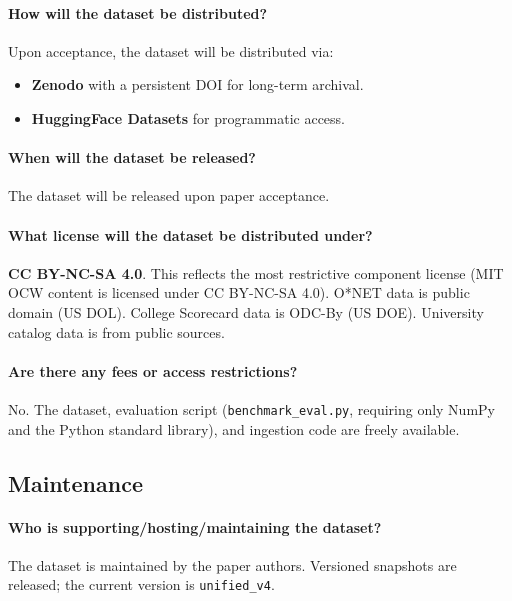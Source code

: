\paragraph{How will the dataset be distributed?}
Upon acceptance, the dataset will be distributed via:
\begin{itemize}
  \item \textbf{Zenodo} with a persistent DOI for long-term archival.
  \item \textbf{HuggingFace Datasets} for programmatic access.
\end{itemize}

\paragraph{When will the dataset be released?}
The dataset will be released upon paper acceptance.

\paragraph{What license will the dataset be distributed under?}
\textbf{CC BY-NC-SA 4.0}. This reflects the most restrictive component license (MIT OCW content is licensed under CC BY-NC-SA 4.0). O*NET data is public domain (US DOL). College Scorecard data is ODC-By (US DOE). University catalog data is from public sources.

\paragraph{Are there any fees or access restrictions?}
No. The dataset, evaluation script (\texttt{benchmark\_eval.py}, requiring only NumPy and the Python standard library), and ingestion code are freely available.

\subsection{Maintenance}

\paragraph{Who is supporting/hosting/maintaining the dataset?}
The dataset is maintained by the paper authors. Versioned snapshots are released; the current version is \texttt{unified\_v4}.

